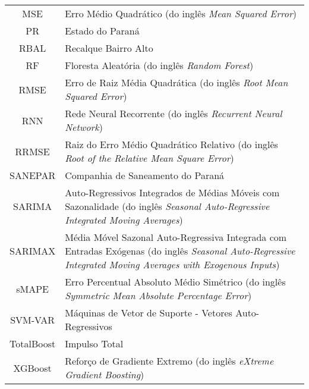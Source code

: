 \begin{tabular}{cp{}}
	MSE & Erro Médio Quadrático (do inglês \textit{Mean Squared Error})\\
	PR & Estado do Paraná\\
	RBAL & Recalque Bairro Alto\\
	RF & Floresta Aleatória (do inglês \textit{Random Forest})\\
	RMSE & Erro de Raiz Média Quadrática (do inglês \textit{Root Mean Squared Error})\\
	RNN & Rede Neural Recorrente (do inglês \textit{Recurrent Neural Network})\\
	RRMSE & Raiz do Erro Médio Quadrático Relativo (do inglês \textit{Root of the Relative Mean Square Error})\\
	SANEPAR & Companhia de Saneamento do Paraná \\
	SARIMA & Auto-Regressivos Integrados de Médias Móveis com Sazonalidade (do inglês \textit{Seasonal Auto-Regressive Integrated Moving Averages}) \\
	SARIMAX & Média Móvel Sazonal Auto-Regressiva Integrada com Entradas Exógenas (do inglês \textit{Seasonal Auto-Regressive Integrated Moving Averages with Exogenous Inputs}) \\
	sMAPE &  Erro Percentual Absoluto Médio Simétrico (do inglês \textit{Symmetric Mean Absolute Percentage Error})\\
	SVM-VAR & Máquinas de Vetor de Suporte - Vetores Auto-Regressivos\\
	TotalBoost & Impulso Total\\
	XGBoost & Reforço de Gradiente Extremo (do inglês \textit{eXtreme Gradient Boosting})
\end{tabular}
